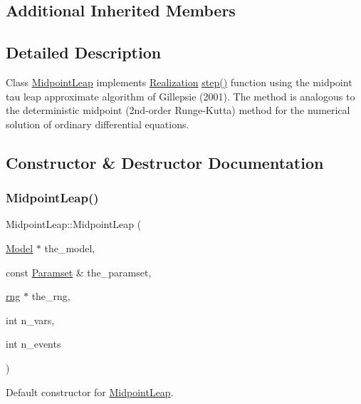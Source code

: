 \subsection*{Additional Inherited Members}


\subsection{Detailed Description}
Class \hyperlink{class_midpoint_leap}{Midpoint\+Leap} implements \hyperlink{class_realization}{Realization} \hyperlink{class_midpoint_leap_a8afc1a6a8777157f7b42ec08a848b564}{step()} function using the midpoint tau leap approximate algorithm of Gillepsie (2001). The method is analogous to the deterministic midpoint (2nd-\/order Runge-\/\+Kutta) method for the numerical solution of ordinary differential equations. 

\subsection{Constructor \& Destructor Documentation}
\mbox{\label{class_midpoint_leap_a9e5301b74a349ecc4c1de994426eb8b2}} 
\subsubsection{\texorpdfstring{Midpoint\+Leap()}{MidpointLeap()}}
{\footnotesize\ttfamily Midpoint\+Leap\+::\+Midpoint\+Leap (\begin{DoxyParamCaption}\item[{\hyperlink{class_model}{Model} $\ast$}]{the\+\_\+model,  }\item[{const \hyperlink{class_paramset}{Paramset} \&}]{the\+\_\+paramset,  }\item[{\hyperlink{classrng}{rng} $\ast$}]{the\+\_\+rng,  }\item[{int}]{n\+\_\+vars,  }\item[{int}]{n\+\_\+events }\end{DoxyParamCaption})}



Default constructor for \hyperlink{class_midpoint_leap}{Midpoint\+Leap}. 


